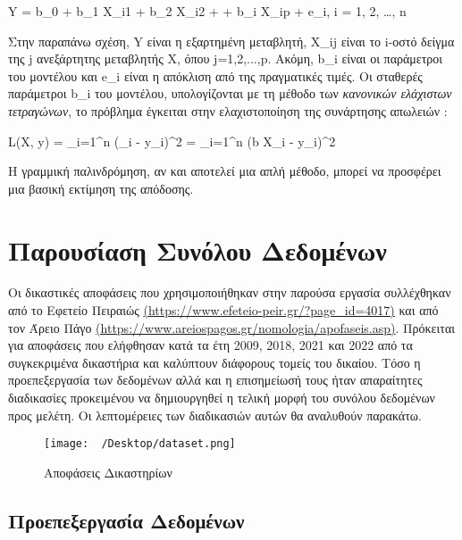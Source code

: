 \documentclass[diploma]{softlab-thesis}
\begin{document}
Y = b_0 + b_1 X_{i1} + b_2 X_{i2} + \cdots + b_i X_{ip} + e_i, \quad {} i = 1, 2, \ldots, n \vspace{1cm}


Στην παραπάνω σχέση, Y είναι η εξαρτημένη μεταβλητή, X_{ij} είναι το i-οστό δείγμα της j ανεξάρτητης μεταβλητής X, όπου j=1,2,...,p. Ακόμη, b_i είναι οι παράμετροι του μοντέλου και e_i είναι η απόκλιση από της πραγματικές τιμές. Οι σταθερές παράμετροι b_i του μοντέλου, υπολογίζονται με τη μέθοδο των \textit{κανονικών ελάχιστων τετραγώνων}, το πρόβλημα έγκειται στην ελαχιστοποίηση της συνάρτησης απωλειών : \vspace{1cm}

L(X, y) = \sum_{i=1}^n (_i - y_i)^2 = \sum_{i=1}^n (b \cdot X_i - y_i)^2 \vspace{1cm}


Η γραμμική παλινδρόμηση, αν και αποτελεί μια απλή μέθοδο, μπορεί να προσφέρει μια βασική εκτίμηση της απόδοσης.


\chapter{Παρουσίαση Συνόλου Δεδομένων}

\sloppy
Οι δικαστικές αποφάσεις που χρησιμοποιήθηκαν στην παρούσα εργασία συλλέχθηκαν από το Εφετείο Πειραιώς \href{https://www.efeteio-peir.gr/?page\_id=4017}{(https://www.efeteio-peir.gr/?page\_id=4017)} και από τον Άρειο Πάγο \href{https://www.areiospagos.gr/nomologia/apofaseis.asp}{(https://www.areiospagos.gr/nomologia/apofaseis.asp)}. 
Πρόκειται για αποφάσεις που ελήφθησαν κατά τα έτη 2009, 2018, 2021 και 2022 από τα συγκεκριμένα δικαστήρια και καλύπτουν διάφορους τομείς του δικαίου. Τόσο η προεπεξεργασία των δεδομένων αλλά και η επισημείωσή τους ήταν απαραίτητες διαδικασίες προκειμένου να δημιουργηθεί η τελική μορφή του συνόλου δεδομένων προς μελέτη. Οι λεπτομέρειες των διαδικασιών αυτών θα αναλυθούν παρακάτω.

\begin{figure}[h]
    \centering
    \texttt{[image: ~/Desktop/dataset.png]} %
    \caption{Αποφάσεις Δικαστηρίων}
    \label{fig:your_image_label}
\end{figure}



\section{Προεπεξεργασία Δεδομένων}
\end{document}
